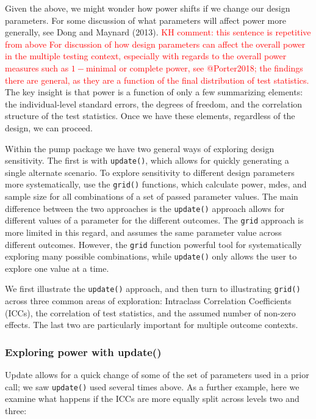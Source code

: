 \documentclass[
]{article}
\begin{document}
Given the above, we might wonder how power shifts if we change our
design parameters. For some discussion of what parameters will affect
power more generally, see Dong and Maynard (2013).
\textcolor{red}{KH comment: this sentence is repetitive from above
For discussion of how design parameters can affect the overall power in the multiple testing context, especially with regards to the overall power measures such as $1-$minimal or complete power, see @Porter2018; the findings there are general, as they are a function of the final distribution of test statistics.}
The key insight is that power is a function of only a few summarizing
elements: the individual-level standard errors, the degrees of freedom,
and the correlation structure of the test statistics. Once we have these
elements, regardless of the design, we can proceed.

Within the pump package we have two general ways of exploring design
sensitivity. The first is with \texttt{update()}, which allows for
quickly generating a single alternate scenario. To explore sensitivity
to different design parameters more systematically, use the
\texttt{grid()} functions, which calculate power, mdes, and sample size
for all combinations of a set of passed parameter values. The main
difference between the two approaches is the \texttt{update()} approach
allows for different values of a parameter for the different outcomes.
The \texttt{grid} approach is more limited in this regard, and assumes
the same parameter value across different outcomes. However, the
\texttt{grid} function powerful tool for systematically exploring many
possible combinations, while \texttt{update()} only allows the user to
explore one value at a time.

We first illustrate the \texttt{update()} approach, and then turn to
illustrating \texttt{grid()} across three common areas of exploration:
Intraclass Correlation Coefficients (ICCs), the correlation of test
statistics, and the assumed number of non-zero effects. The last two are
particularly important for multiple outcome contexts.

\subsubsection{Exploring power with update()}

Update allows for a quick change of some of the set of parameters used
in a prior call; we saw \texttt{update()} used several times above. As a
further example, here we examine what happens if the ICCs are more
equally split across levels two and three:
\end{document}
